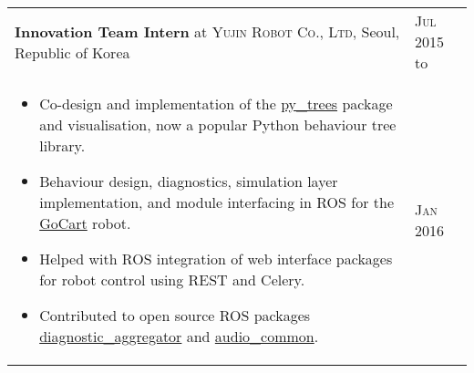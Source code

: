 \documentclass[a4paper,10pt]{article}
\newcommand{\datelen}{1.8cm}
\newcommand{\descrlen}{15.5cm}
\begin{document}
\begin{tabular}{p{\descrlen}|p{\datelen}}
\begin{comment}
    In brief, I was to use computer vision and other sensing modalities available to the robot to map dynamic environments, storing information about the nature of the dynamics, and then feed this information to higher and lower level information processing so that it could be used to improve the safety of the overall system. Some of the project partners were using robots developed at Fraunhofer (the care-o-bot series), and so part of my job was to provide software support for the robots.
  \end{comment}
  \textbf{Innovation Team Intern} at \textsc{Yujin Robot Co., Ltd}, Seoul, Republic of Korea & \textsc{Jul 2015} to\\
  \begin{comment}
    Part of the team working on development of software for the GoCart delivery robot, designed to operate in nursing homes and other healthcare and hospitality environments. Worked on behaviour trees and behaviour implementation, diagnostics and module interfacing in C++ and Python with ROS. Made some small contributions to the audio_common and diagnostics packages in ROS.
  \end{comment}
  \small{
      \vspace{-0.4cm}
  \begin{itemize}
   \item Co-design and implementation of the \href{https://github.com/splintered-reality/py_trees}{py\_trees} package and visualisation, now a popular Python behaviour tree library.
  \item Behaviour design, diagnostics, simulation layer implementation, and module interfacing in ROS for the \href{https://yujinrobot.com/autonomous-mobility-solutions/mobile-platform/gocart/}{GoCart} robot. 
  \item Helped with ROS integration of web interface packages for robot control using REST and Celery.
  \item Contributed to open source ROS packages \href{https://github.com/ros/diagnostics}{diagnostic\_aggregator} and \href{https://github.com/ros-drivers/audio_common}{audio\_common}.
  \vspace{-0.5cm}
  \end{itemize}
  }&\textsc{Jan 2016}\\

\end{tabular}
\end{document}

